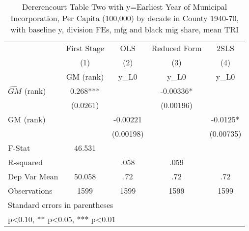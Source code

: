 \begin{table}[htbp]\centering
\def\sym#1{\ifmmode^{#1}\else\(^{#1}\)\fi}
\caption{Dererencourt Table Two with y=Earliest Year of Municipal Incorporation, Per Capita (100,000) by decade in County 1940-70, with baseline y, division FEs, mfg and black mig share, mean TRI}
\begin{tabular}{l*{4}{c}}
\toprule
                    & First Stage   &         OLS   &Reduced Form   &        2SLS   \\
                    &\multicolumn{1}{c}{(1)}&\multicolumn{1}{c}{(2)}&\multicolumn{1}{c}{(3)}&\multicolumn{1}{c}{(4)}\\
                    &\multicolumn{1}{c}{GM  (rank)}&\multicolumn{1}{c}{y\_L0}&\multicolumn{1}{c}{y\_L0}&\multicolumn{1}{c}{y\_L0}\\
\midrule
$\hat{GM}$ (rank)   &       0.268***&               &    -0.00336*  &               \\
                    &    (0.0261)   &               &   (0.00196)   &               \\
\addlinespace
GM  (rank)          &               &    -0.00221   &               &     -0.0125*  \\
                    &               &   (0.00198)   &               &   (0.00735)   \\
\midrule
F-Stat              &      46.531   &               &               &               \\
R-squared           &               &        .058   &        .059   &               \\
Dep Var Mean        &      50.058   &         .72   &         .72   &         .72   \\
Observations        &        1599   &        1599   &        1599   &        1599   \\
\bottomrule
\multicolumn{5}{l}{\footnotesize Standard errors in parentheses}\\
\multicolumn{5}{l}{\footnotesize * p<0.10, ** p<0.05, *** p<0.01}\\
\end{tabular}
\end{table}
